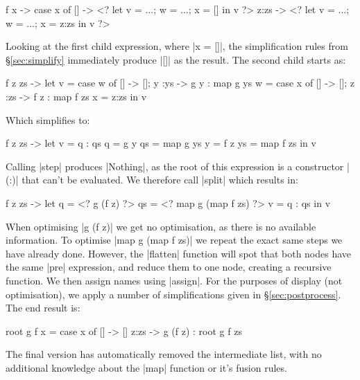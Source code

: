 \documentclass[draft]{sigplanconf}
\begin{document}
\begin{code}
\g f x -> case  x of
                []    -> <? let v = ...; w = ...; x = []    in v ?>
                z:zs  -> <? let v = ...; w = ...; x = z:zs  in v ?>
\end{code}

Looking at the first child expression, where |x = []|, the simplification rules from \S\ref{sec:simplify} immediately produce |[]| as the result. The second child starts as:

\begin{code}
\g f z zs ->
    let  v  = case  w  of [] -> []; y  :ys  -> g  y  : map g  ys
         w  = case  x  of [] -> []; z  :zs  -> f  z  : map f  zs
         x  = z:zs
    in   v
\end{code}

Which simplifies to:

\begin{code}
\g f z zs ->  let  v   = q : qs
                   q   = g y
                   qs  = map g ys
                   y   = f z
                   ys  = map f zs
              in   v
\end{code}

Calling |step| produces |Nothing|, as the root of this expression is a constructor |(:)| that can't be evaluated. We therefore call |split| which results in:

\begin{code}
\g f z zs ->  let  q   = <? g (f z) ?>
                   qs  = <? map g (map f zs) ?>
                   v   = q : qs
              in   v
\end{code}

When optimising |g (f z)| we get no optimisation, as there is no available information. To optimise |map g (map f zs)| we repeat the exact same steps we have already done. However, the |flatten| function will spot that both nodes have the same |pre| expression, and reduce them to one node, creating a recursive function. We then assign names using |assign|. For the purposes of display (not optimisation), we apply a number of simplifications given in \S\ref{sec:postprocess}. The end result is:

\begin{code}
root g f x = case  x of
                   []    -> []
                   z:zs  -> g (f z) : root g f zs
\end{code}

The final version has automatically removed the intermediate list, with no additional knowledge about the |map| function or it's fusion rules.
\end{document}
